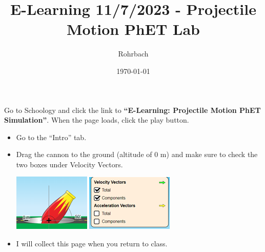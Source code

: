 \documentclass[10pt]{exam}
\title{E-Learning 11/7/2023 - Projectile Motion PhET Lab}
\author{Rohrbach}
\date{\today}
\begin{document}
\maketitle

\noindent
Go to Schoology and click the link to {\bf ``E-Learning: Projectile Motion PhET Simulation''}.  When the page loads, click the play button.

\begin{itemize}
  \item Go to the ``Intro'' tab.
  \item Drag the cannon to the ground (altitude of 0 m)	and make sure to check the two boxes under Velocity Vectors.
  
  \includegraphics{cannon.png} \includegraphics{checkboxes.png}

  \item I will collect this page when you return to class.
\end{itemize}
\end{document}
